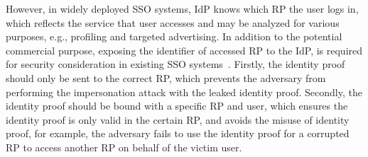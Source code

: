 However, in widely deployed SSO systems, IdP knows which RP the user logs in, which reflects the service that user accesses and may be analyzed for various purposes, e.g., profiling and targeted advertising. In addition to the potential commercial purpose, exposing the identifier of accessed RP to the IdP, is required  for security consideration in existing SSO systems~\cite{ChenPCTKT14}. Firstly, the identity proof should only be sent to the correct RP, which prevents the adversary from performing the impersonation attack with the leaked identity proof. Secondly, the identity proof should be bound with a specific RP and user, which ensures the identity proof is only valid in the certain RP, and avoids the misuse of identity proof, for example, the adversary fails to  use the identity proof for a corrupted RP to  access another RP on behalf of the victim user.




